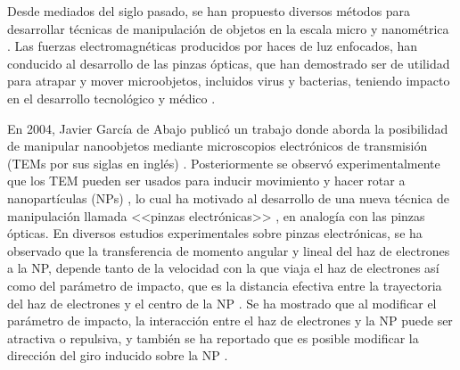 
Desde mediados del siglo pasado, se han propuesto diversos métodos para desarrollar técnicas de manipulación de objetos en la escala micro y nanométrica \cite{ashkin1970acceleration, ashkin1987optical, Ashkin, custance2009atomic, dholakia2011shaping, marago2013optical, romo2020controlled}. Las fuerzas electromagnéticas producidos por haces de luz enfocados, han conducido al desarrollo de las pinzas ópticas, que han demostrado ser de utilidad para atrapar y mover microobjetos, incluidos virus y bacterias, teniendo impacto en el desarrollo tecnológico y médico \cite{ashkin1970acceleration, ashkin1987optical, Ashkin}.  

En 2004, Javier García de Abajo publicó un trabajo donde aborda la posibilidad de manipular nanoobjetos mediante microscopios electrónicos de transmisión (TEMs por sus siglas en inglés) \cite{GarciadeAbajo0}. Posteriormente se observó experimentalmente que los TEM pueden ser usados para inducir movimiento y hacer rotar a nanopartículas (NPs) \cite{Batson01, zheng2012electron}, lo cual ha motivado al desarrollo de una nueva técnica de manipulación llamada <<pinzas electrónicas>> \cite{Batson, oleshko2005electron, Oleshko}, en analogía con las pinzas ópticas. En diversos estudios experimentales sobre pinzas electrónicas, se ha observado que la transferencia de momento angular y lineal del haz de electrones a la NP, depende tanto de la velocidad con la que viaja el haz de electrones así como del parámetro de impacto, que es la distancia efectiva entre la trayectoria del haz de electrones y el centro de la NP \cite{OLESHKO2013203, Oleshko, Batson, Batson01, zheng2012electron, xu2010transmission}.  Se ha mostrado que al modificar el parámetro de impacto, la interacción entre el haz de electrones y la NP puede ser atractiva o repulsiva, y también se ha reportado que es posible modificar la dirección del giro inducido sobre la NP \cite{OLESHKO2013203, Batson, Oleshko}. 

